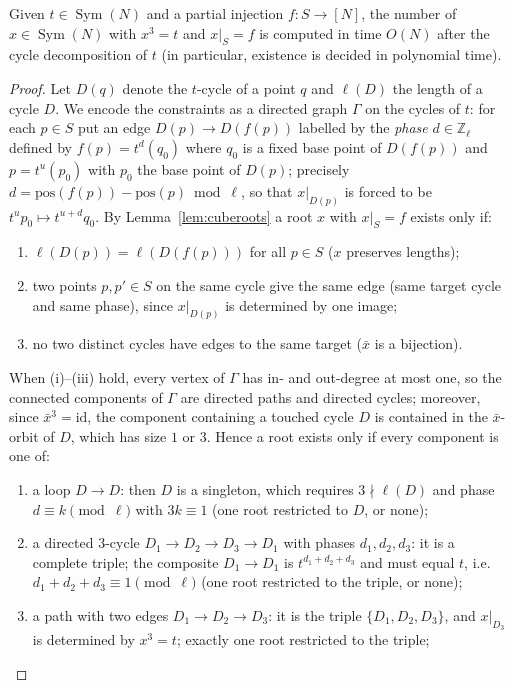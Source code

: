 \documentclass[preprint,12pt]{elsarticle}
\theoremstyle{definition}\newtheorem{defi}[thm]{Definition}\newtheorem{prob}[thm]{Problem}\newtheorem{obs}[thm]{Observation}
\theoremstyle{remark}\newtheorem{rem}[thm]{Remark}
\newcommand{\ZZ}{\mathbb Z}\newcommand{\Sym}{\operatorname{Sym}}\newcommand{\Alt}{\operatorname{Alt}}
\begin{document}
\begin{lem}\label{lem:prescribed}
Given $t\in\Sym(N)$ and a partial injection $f\colon S\to[N]$, the number of $x\in\Sym(N)$ with $x^{3}=t$ and $x|_{S}=f$ is computed in time $O(N)$ after the cycle decomposition of $t$ (in particular, existence is decided in polynomial time).
\end{lem}
\begin{proof}
Let $D(q)$ denote the $t$-cycle of a point $q$ and $\ell(D)$ the length of a cycle $D$. We encode the constraints as a directed graph $\Gamma$ on the cycles of $t$: for each $p\in S$ put an edge $D(p)\to D(f(p))$ labelled by the \emph{phase} $d\in\ZZ_{\ell}$ defined by $f(p)=t^{d}(q_{0})$ where $q_0$ is a fixed base point of $D(f(p))$ and $p=t^{u}(p_0)$ with $p_0$ the base point of $D(p)$; precisely $d=\mathrm{pos}(f(p))-\mathrm{pos}(p)\bmod\ell$, so that $x|_{D(p)}$ is forced to be $t^{u}p_0\mapsto t^{u+d}q_0$. By Lemma~\ref{lem:cuberoots} a root $x$ with $x|_S=f$ exists only if:
\begin{enumerate}
\item[(i)] $\ell(D(p))=\ell(D(f(p)))$ for all $p\in S$ ($x$ preserves lengths);
\item[(ii)] two points $p,p'\in S$ on the same cycle give the same edge (same target cycle and same phase), since $x|_{D(p)}$ is determined by one image;
\item[(iii)] no two distinct cycles have edges to the same target ($\bar x$ is a bijection).
\end{enumerate}
When (i)--(iii) hold, every vertex of $\Gamma$ has in- and out-degree at most one, so the connected components of $\Gamma$ are directed paths and directed cycles; moreover, since $\bar x^{3}=\mathrm{id}$, the component containing a touched cycle $D$ is contained in the $\bar x$-orbit of $D$, which has size $1$ or $3$. Hence a root exists only if every component is one of:
\begin{enumerate}
\item[(a)] a loop $D\to D$: then $D$ is a singleton, which requires $3\nmid\ell(D)$ and phase $d\equiv k\pmod\ell$ with $3k\equiv1$ (one root restricted to $D$, or none);
\item[(b)] a directed $3$-cycle $D_1\to D_2\to D_3\to D_1$ with phases $d_1,d_2,d_3$: it is a complete triple; the composite $D_1\to D_1$ is $t^{d_1+d_2+d_3}$ and must equal $t$, i.e.\ $d_1+d_2+d_3\equiv1\pmod\ell$ (one root restricted to the triple, or none);
\item[(c)] a path with two edges $D_1\to D_2\to D_3$: it is the triple $\{D_1,D_2,D_3\}$, and $x|_{D_3}$ is determined by $x^{3}=t$; exactly one root restricted to the triple;

\end{enumerate}
\end{proof}
\end{document}
